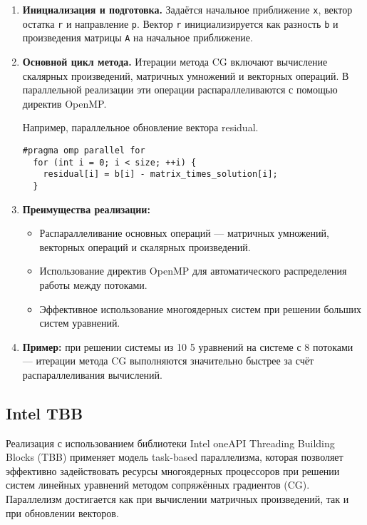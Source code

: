 \documentclass[12pt]{article}
\begin{document}
\begin{enumerate}
\item \textbf{Инициализация и подготовка.}
Задаётся начальное приближение \texttt{x}, вектор остатка \texttt{r} и направление \texttt{p}. Вектор \texttt{r} инициализируется как разность \texttt{b} и произведения матрицы \texttt{A} на начальное приближение.

\item \textbf{Основной цикл метода.}
Итерации метода CG включают вычисление скалярных произведений, матричных умножений и векторных операций. В параллельной реализации эти операции распараллеливаются с помощью директив OpenMP.

Например, параллельное обновление вектора residual.
\begin{lstlisting}
#pragma omp parallel for
  for (int i = 0; i < size; ++i) {
    residual[i] = b[i] - matrix_times_solution[i];
  }
  \end{lstlisting}

\item \textbf{Преимущества реализации:} \begin{itemize} \item Распараллеливание основных операций — матричных умножений, векторных операций и скалярных произведений. \item Использование директив OpenMP для автоматического распределения работы между потоками. \item Эффективное использование многоядерных систем при решении больших систем уравнений. \end{itemize}

\item \textbf{Пример:} при решении системы из 10 
5
  уравнений на системе с 8 потоками — итерации метода CG выполняются значительно быстрее за счёт распараллеливания вычислений.
\end{enumerate}

\subsection{Intel TBB}

Реализация с использованием библиотеки Intel oneAPI Threading Building Blocks (TBB) применяет модель task-based параллелизма, которая позволяет эффективно задействовать ресурсы многоядерных процессоров при решении систем линейных уравнений методом сопряжённых градиентов (CG). Параллелизм достигается как при вычислении матричных произведений, так и при обновлении векторов.
\end{document}
